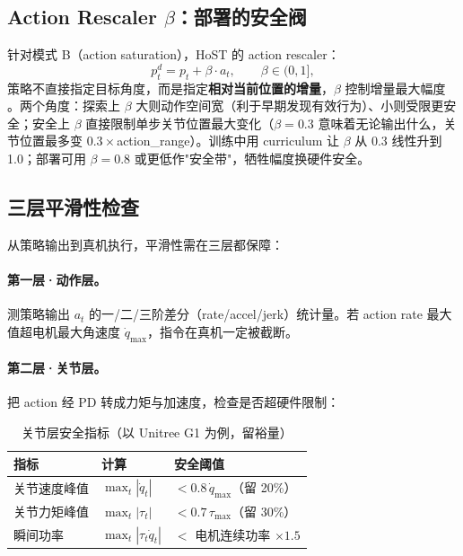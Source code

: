 \subsection{\texorpdfstring{Action Rescaler $\beta$：部署的安全阀}{Action Rescaler beta：部署的安全阀}}

针对模式 B（action saturation），HoST 的 action rescaler：
\begin{equation}
p_t^d = p_t + \beta\cdot a_t , \qquad \beta\in(0,1],
\label{eq:rlmc-diag-rescaler}
\end{equation}
策略不直接指定目标角度，而是指定\textbf{相对当前位置的增量}，$\beta$ 控制增量最大幅度 \cite{huang2025host}。两个角度：探索上 $\beta$ 大则动作空间宽（利于早期发现有效行为）、小则受限更安全；安全上 $\beta$ 直接限制单步关节位置最大变化（$\beta=0.3$ 意味着无论输出什么，关节位置最多变 $0.3\times$action\_range）。训练中用 curriculum 让 $\beta$ 从 0.3 线性升到 1.0；部署可用 $\beta=0.8$ 或更低作"安全带"，牺牲幅度换硬件安全。

\subsection{三层平滑性检查}

从策略输出到真机执行，平滑性需在三层都保障：

\paragraph{第一层·动作层。}测策略输出 $a_t$ 的一/二/三阶差分（rate/accel/jerk）统计量。若 action rate 最大值超电机最大角速度 $\dot q_{\max}$，指令在真机一定被截断。

\paragraph{第二层·关节层。}把 action 经 PD 转成力矩与加速度，检查是否超硬件限制：

\begin{table}[H]
\centering
\caption{关节层安全指标（以 Unitree G1 为例，留裕量）}
\label{tab:rlmc-diag-joint}
\begin{tabular}{p{3.0cm}p{3.4cm}p{5.4cm}}
\hline
指标 & 计算 & 安全阈值 \\
\hline
关节速度峰值 & $\max_t|\dot q_t|$ & $<0.8\,\dot q_{\max}$（留 20\%） \\
关节力矩峰值 & $\max_t|\tau_t|$ & $<0.7\,\tau_{\max}$（留 30\%） \\
瞬间功率 & $\max_t|\tau_t\dot q_t|$ & $<$ 电机连续功率 $\times 1.5$ \\
\hline
\end{tabular}
\end{table}

